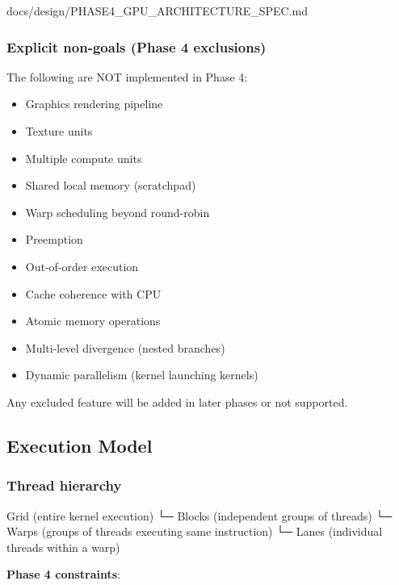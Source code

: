 \begin{relocated}{docs/design/PHASE4_GPU_ARCHITECTURE_SPEC.md}
\subsubsection{Explicit non-goals (Phase 4 exclusions)}\label{ds:ch:phase4-gpu-architecture:explicit-non-goals-phase-4-exclusions}

The following are NOT implemented in Phase 4:

\begin{itemize}
\tightlist
\item
  Graphics rendering pipeline
\item
  Texture units
\item
  Multiple compute units
\item
  Shared local memory (scratchpad)
\item
  Warp scheduling beyond round-robin
\item
  Preemption
\item
  Out-of-order execution
\item
  Cache coherence with CPU
\item
  Atomic memory operations
\item
  Multi-level divergence (nested branches)
\item
  Dynamic parallelism (kernel launching kernels)
\end{itemize}

Any excluded feature will be added in later phases or not supported.

\subsection{Execution Model}\label{ds:ch:phase4-gpu-architecture:execution-model}

\subsubsection{Thread hierarchy}\label{ds:ch:phase4-gpu-architecture:thread-hierarchy}

\begin{textblock}
Grid (entire kernel execution)
  └─ Blocks (independent groups of threads)
      └─ Warps (groups of threads executing same instruction)
          └─ Lanes (individual threads within a warp)
\end{textblock}

\textbf{Phase 4 constraints}:


\end{relocated}
